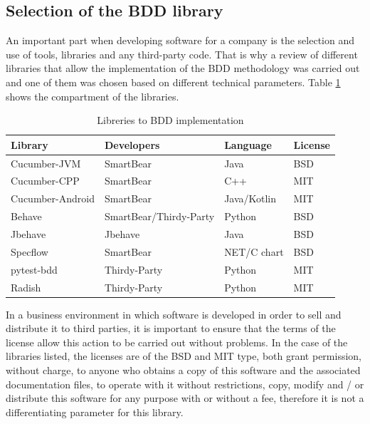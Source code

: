 \documentclass[journal]{IEEEtran}	%
\begin{document}
\subsection{Selection of the BDD library}
An important part when developing software for a company is the selection and use of tools, libraries and any third-party code. That is why a review of different libraries that allow the implementation of the BDD methodology was carried out and one of them was chosen based on different technical parameters. Table \ref{tab:libraries} shows the compartment of the libraries.
\begin{table}[H]
\renewcommand{\arraystretch}{1.25}		%
\centering
\caption{Libreries to BDD implementation}	%
\label{tab:libraries}
\begin{tabular}{l|l|l|l}					%
\hline \hline
\textbf{Library}        				&   \textbf{Developers}     &	\textbf{Language}	&	\textbf{License}			\\
\hline
Cucumber-JVM        &   SmartBear	            &	Java            &   BSD\\
Cucumber-CPP        &   SmartBear	            &	C++             &   MIT\\
Cucumber-Android    &   SmartBear	            &	Java/Kotlin     &   MIT\\
Behave              &   SmartBear/Thirdy-Party	&	Python          &   BSD\\
Jbehave             &   Jbehave	                &	Java            &   BSD\\
Specflow            &   SmartBear	            &	NET/C chart     &   BSD\\
pytest-bdd          &   Thirdy-Party	        &	Python          &   MIT\\
Radish              &   Thirdy-Party	        &	Python          &   MIT\\
\hline
\hline \hline
\end{tabular}
\end{table}

In a business environment in which software is developed in order to sell and distribute it to third parties, it is important to ensure that the terms of the license allow this action to be carried out without problems. In the case of the libraries listed, the licenses are of the BSD and MIT type, both grant permission, without charge, to anyone who obtains a copy of this software and the associated documentation files, to operate with it without restrictions, copy, modify and / or distribute this software for any purpose with or without a fee, therefore it is not a differentiating parameter for this library.
\end{document}
